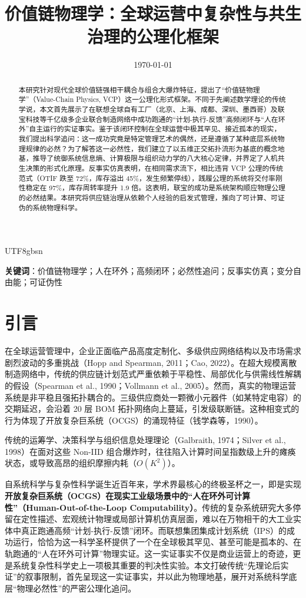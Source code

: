 \documentclass[11pt,a4paper]{article}
\title{\textbf{价值链物理学：全球运营中复杂性与共生治理的公理化框架}}
\author{}
\date{\today}
\begin{document}
\begin{CJK*}{UTF8}{gbsn}

\maketitle

\begin{abstract}
本研究针对现代全球价值链强相干耦合与组合大爆炸特征，提出了“价值链物理学”（Value-Chain Physics, VCP）这一公理化形式框架。不同于先阐述数学理论的传统学说，本文首先展示了在联想全球自有工厂（北京、上海、成都、深圳、墨西哥）及联宝科技等千亿级多企业联合制造网络中成功跑通的“计划-执行-反馈”高频闭环与“人在环外”自主运行的实证事实。鉴于该闭环控制在全球运营中极其罕见、接近孤本的现实，我们提出科学追问：这一成功究竟是特定管理艺术的偶然，还是遵循了某种底层系统物理规律的必然？为了解答这一必然性，我们建立了以五维正交拓扑流形为基底的概念地基，推导了统御系统信息熵、计算极限与组织动力学的八大核心定律，并界定了人机共生决策的形式化原理。反事实仿真表明，在相同需求流下，相比违背 VCP 公理的传统范式（OTIF 跌至 72\%，库存溢出 45\%，发生频繁停线），践履公理的系统将交付率刚性稳定在 97\%，库存周转率提升 1.9 倍。这表明，联宝的成功是系统架构顺应物理公理的必然结果。本研究将供应链治理从依赖个人经验的启发式管理，推向了可计算、可证伪的系统物理科学。
\end{abstract}

\textbf{关键词}：价值链物理学；人在环外；高频闭环；必然性追问；反事实仿真；变分自由能；可证伪性

\newpage

\section{引言}
在全球运营管理中，企业正面临产品高度定制化、多级供应网络结构以及市场需求剧烈波动的多重挑战（Hopp and Spearman, 2011；Cao, 2022）。在超大规模离散制造网络中，传统的供应链计划范式严重依赖于平稳性、局部优化与供需线性解耦的假设（Spearman et al., 1990；Vollmann et al., 2005）。然而，真实的物理运营系统是非平稳且强拓扑耦合的。三级供应商处一颗微小元器件（如某特定电容）的交期延迟，会沿着 20 层 BOM 拓扑网络向上蔓延，引发级联断链。这种相变式的行为体现了开放复杂巨系统（OCGS）的涌现特征（钱学森等，1990）。

传统的运筹学、决策科学与组织信息处理理论（Galbraith, 1974；Silver et al., 1998）在面对这些 Non-IID 组合爆炸时，往往陷入计算时间呈指数级上升的瘫痪状态，或导致高昂的组织摩擦内耗（$O(K^2)$）。

自系统科学与复杂性科学诞生近百年来，学术界最核心的终极圣杯之一，即是实现\textbf{开放复杂巨系统（OCGS）在现实工业级场景中的“人在环外可计算性”（Human-Out-of-the-Loop Computability）}。传统的复杂系统研究大多停留在定性描述、宏观统计物理或局部计算机仿真层面，难以在万物相干的大工业实体中真正跑通高频“计划-执行-反馈”闭环。而联想集团集成计划系统（IPS）的成功运行，恰恰为这一科学圣杯提供了一个在全球极其罕见、甚至可能是孤本的、在轨跑通的“人在环外可计算”物理实证。这一实证事实不仅是商业运营上的奇迹，更是系统复杂性科学史上一项极其重要的判决性实验。本文打破传统“先理论后实证”的叙事限制，首先呈现这一实证事实，并以此为物理地基，展开对系统科学底层“物理必然性”的严密公理化追问。


\end{CJK*}
\end{document}
